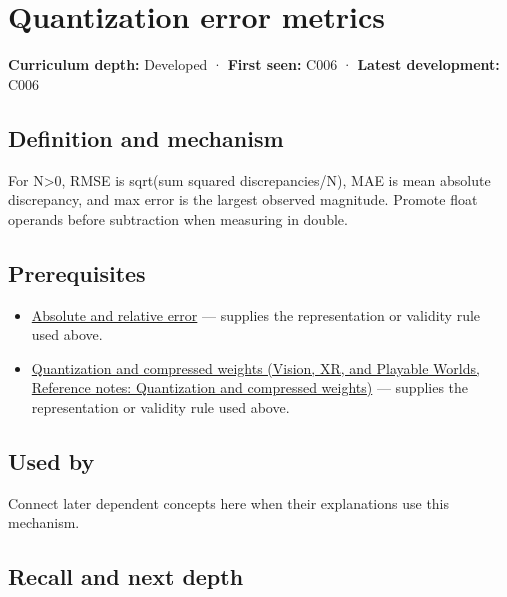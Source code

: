 \hypertarget{appendix-537171d69d27}{}\label{referencestart:appendix-537171d69d27}
\section{Quantization error metrics}\label{appendix-537171d69d27-quantization-error-metrics}

\textbf{Curriculum depth:} Developed · \textbf{First seen:} C006 · \textbf{Latest development:} C006

\subsection{Definition and mechanism}\label{appendix-537171d69d27-definition-and-mechanism}

For N\textgreater0, RMSE is sqrt(sum squared discrepancies/N), MAE is mean absolute discrepancy, and max error is the largest observed magnitude. Promote float operands before subtraction when measuring in double.

\subsection{Prerequisites}\label{appendix-537171d69d27-prerequisites}

\begin{itemize}
\tightlist
\item
  \hyperref[appendix-3ae74e89b4e6]{Absolute and relative error} --- supplies the representation or validity rule used above.
\item
  \href{../07-Vision-XR-and-Playable-Worlds/main.pdf\#nameddest=appendix-fdc7879e8bf2}{Quantization and compressed weights (Vision, XR, and Playable Worlds, Reference notes: Quantization and compressed weights)} --- supplies the representation or validity rule used above.
\end{itemize}

\subsection{Used by}\label{appendix-537171d69d27-used-by}

Connect later dependent concepts here when their explanations use this mechanism.

\subsection{Recall and next depth}\label{appendix-537171d69d27-recall-and-next-depth}

